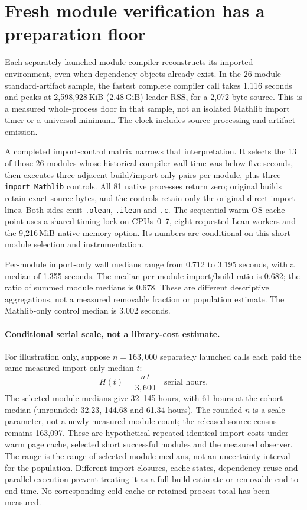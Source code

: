 \documentclass[10pt,twocolumn]{article}
\begin{document}
\section{Fresh module verification has a preparation floor}
\label{sec:imports}
Each separately launched module compiler reconstructs its imported
environment, even when dependency objects already exist.
In the 26-module standard-artifact sample, the fastest complete compiler
call takes 1.116 seconds and peaks at 2,598,928\,KiB
(2.48\,GiB) leader RSS, for a 2,072-byte source.
This is a measured whole-process floor in that sample, not an isolated
Mathlib import timer or a universal minimum.
The clock includes source processing and artifact emission.

A completed import-control matrix narrows that interpretation.
It selects the 13 of those 26 modules whose historical compiler wall time
was below five seconds, then executes three adjacent build/import-only
pairs per module, plus three \texttt{import Mathlib} controls.
All 81 native processes return zero; original builds retain exact source
bytes, and the controls retain only the original direct import lines.
Both sides emit \texttt{.olean}, \texttt{.ilean} and \texttt{.c}.
The sequential warm-OS-cache point uses a shared timing lock on CPUs~0--7,
eight requested Lean workers and the 9,216\,MiB native memory option.
Its numbers are conditional on this short-module selection and instrumentation.

Per-module import-only wall medians range from 0.712 to 3.195 seconds,
with a median of 1.355 seconds. The median per-module import/build ratio
is 0.682; the ratio of summed module medians is 0.678.
These are different descriptive aggregations, not a measured removable
fraction or population estimate. The Mathlib-only control median is
3.002 seconds.

\paragraph{Conditional serial scale, not a library-cost estimate.}
For illustration only, suppose $n=163{,}000$ separately launched calls
each paid the same measured import-only median $t$:
\[
  H(t)=\frac{n\,t}{3{,}600}\quad\text{serial hours}.
\]
The selected module medians give 32--145 hours, with 61 hours at the
cohort median (unrounded: 32.23, 144.68 and 61.34 hours).
The rounded $n$ is a scale parameter, not a newly measured module count;
the released source census remains 163,097.
These are hypothetical repeated identical import costs under warm page
cache, selected short successful modules and the measured observer.
The range is the range of selected module medians, not an uncertainty
interval for the population.
Different import closures, cache states, dependency reuse and parallel
execution prevent treating it as a full-build estimate or removable
end-to-end time. No corresponding cold-cache or retained-process total
has been measured.
\end{document}
